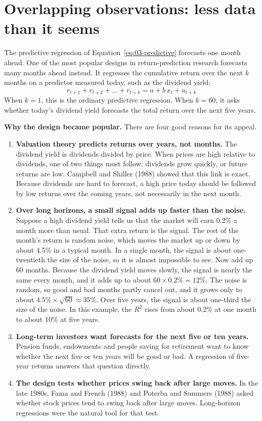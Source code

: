 \section{Overlapping observations: less data than it seems}
\label{sec:03-overlap}

The predictive regression of Equation~\eqref{eq:03-predictive} forecasts one month ahead. One of the most popular designs in return-prediction research forecasts many months ahead instead. It regresses the cumulative return over the next $k$ months on a predictor measured today, such as the dividend yield:
\begin{equation}
  r_{t+1} + r_{t+2} + \dots + r_{t+k} = a + b\,x_t + u_{t+k}
  \label{eq:03-longhorizon}
\end{equation}
When $k = 1$, this is the ordinary predictive regression. When $k = 60$, it asks whether today's dividend yield forecasts the total return over the next five years.

\textbf{Why the design became popular.} There are four good reasons for its appeal.

\begin{enumerate}
  \item \textbf{Valuation theory predicts returns over years, not months.} The dividend yield is dividends divided by price. When prices are high relative to dividends, one of two things must follow: dividends grow quickly, or future returns are low. Campbell and Shiller (1988) showed that this link is exact. Because dividends are hard to forecast, a high price today should be followed by low returns over the coming years, not necessarily in the next month.
  \item \textbf{Over long horizons, a small signal adds up faster than the noise.} Suppose a high dividend yield tells us that the market will earn 0.2\% a month more than usual. That extra return is the signal. The rest of the month's return is random noise, which moves the market up or down by about 4.5\% in a typical month. In a single month, the signal is about one-twentieth the size of the noise, so it is almost impossible to see. Now add up 60 months. Because the dividend yield moves slowly, the signal is nearly the same every month, and it adds up to about $60 \times 0.2\% = 12\%$. The noise is random, so good and bad months partly cancel out, and it grows only to about $4.5\% \times \sqrt{60} \approx 35\%$. Over five years, the signal is about one-third the size of the noise. In this example, the $R^2$ rises from about 0.2\% at one month to about 10\% at five years.
  \item \textbf{Long-term investors want forecasts for the next five or ten years.} Pension funds, endowments and people saving for retirement want to know whether the next five or ten years will be good or bad. A regression of five-year returns answers that question directly.
  \item \textbf{The design tests whether prices swing back after large moves.} In the late 1980s, Fama and French (1988) and Poterba and Summers (1988) asked whether stock prices tend to swing back after large moves. Long-horizon regressions were the natural tool for that test.
\end{enumerate}

